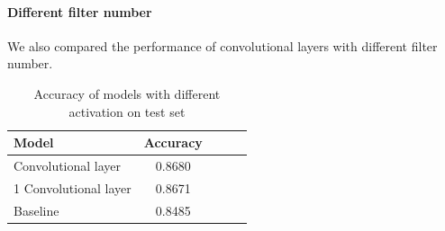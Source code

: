 \documentclass{article}
\begin{document}
\paragraph{Different filter number}
We also compared the performance of convolutional layers with different filter number. 




\begin{table}[tb]
\vskip 3mm
\begin{center}
\begin{small}
\begin{sc}
\begin{tabular}{lcccr}
\hline
\abovespace\belowspace
Model & Accuracy \\
\hline
\abovespace
2 Convolutional layer    	& 0.8680 	\\
1 Convolutional layer	 	& 0.8671 	\\
Baseline				  	& 0.8485 	\\

\hline
\end{tabular}
\end{sc}
\end{small}
\caption{Accuracy of models with different activation on test set}
\label{tab:cnn}
\end{center}
\vskip -3mm
\end{table}



\end{document}

